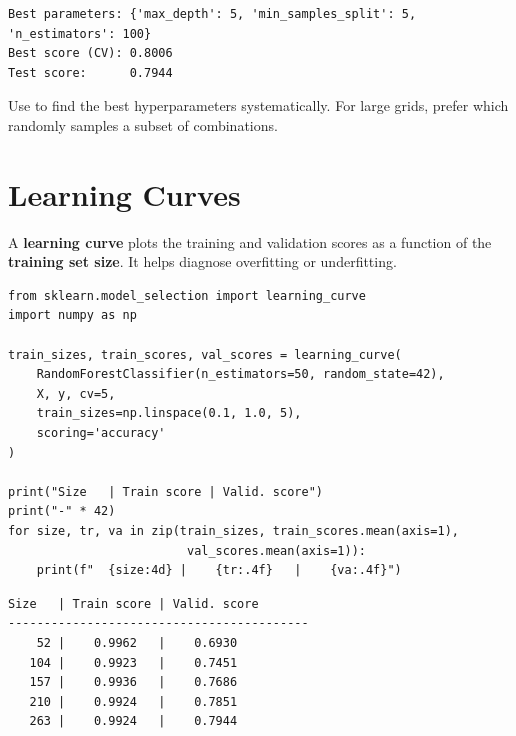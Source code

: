 \begin{codeoutput}
\begin{verbatim}
Best parameters: {'max_depth': 5, 'min_samples_split': 5, 'n_estimators': 100}
Best score (CV): 0.8006
Test score:      0.7944
\end{verbatim}
\end{codeoutput}

\begin{bestpractice}
Use  to find the best hyperparameters systematically. For large grids, prefer  which randomly samples a subset of combinations.
\end{bestpractice}

\section{Learning Curves}
\label{sec:learning_curves}


\begin{definition}
A \textbf{learning curve} plots the training and validation scores as a function of the \textbf{training set size}. It helps diagnose overfitting or underfitting.
\end{definition}

\begin{codeblock}[title=\textbf{Python}]
\begin{verbatim}
from sklearn.model_selection import learning_curve
import numpy as np

train_sizes, train_scores, val_scores = learning_curve(
    RandomForestClassifier(n_estimators=50, random_state=42),
    X, y, cv=5,
    train_sizes=np.linspace(0.1, 1.0, 5),
    scoring='accuracy'
)

print("Size   | Train score | Valid. score")
print("-" * 42)
for size, tr, va in zip(train_sizes, train_scores.mean(axis=1),
                         val_scores.mean(axis=1)):
    print(f"  {size:4d} |    {tr:.4f}   |    {va:.4f}")
\end{verbatim}
\end{codeblock}

\begin{codeoutput}
\begin{verbatim}
Size   | Train score | Valid. score
------------------------------------------
    52 |    0.9962   |    0.6930
   104 |    0.9923   |    0.7451
   157 |    0.9936   |    0.7686
   210 |    0.9924   |    0.7851
   263 |    0.9924   |    0.7944
\end{verbatim}
\end{codeoutput}

